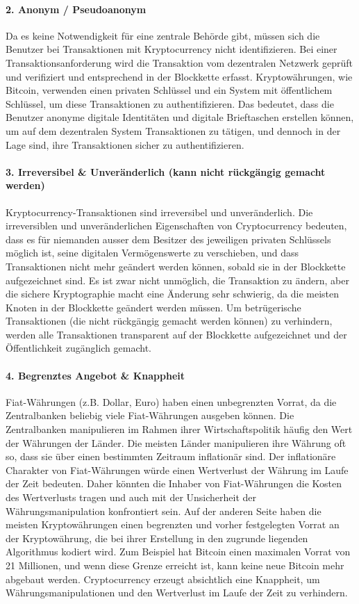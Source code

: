 \documentclass[10pt,a4paper]{article}
\begin{document}
\paragraph*{2. Anonym / Pseudoanonym}
Da es keine Notwendigkeit für eine zentrale Behörde gibt, müssen sich die Benutzer bei Transaktionen mit Kryptocurrency nicht identifizieren. Bei einer Transaktionsanforderung wird die Transaktion vom dezentralen Netzwerk geprüft und verifiziert und entsprechend in der Blockkette erfasst. Kryptowährungen, wie Bitcoin, verwenden einen privaten Schlüssel und ein System mit öffentlichem Schlüssel, um diese Transaktionen zu authentifizieren. Das bedeutet, dass die Benutzer anonyme digitale Identitäten und digitale Brieftaschen erstellen können, um auf dem dezentralen System Transaktionen zu tätigen, und dennoch in der Lage sind, ihre Transaktionen sicher zu authentifizieren.

\paragraph*{3. Irreversibel \& Unveränderlich (kann nicht rückgängig gemacht werden)}
Kryptocurrency-Transaktionen sind irreversibel und unveränderlich. Die irreversiblen und unveränderlichen Eigenschaften von Cryptocurrency bedeuten, dass es für niemanden ausser dem Besitzer des jeweiligen privaten Schlüssels möglich ist, seine digitalen Vermögenswerte zu verschieben, und dass Transaktionen nicht mehr geändert werden können, sobald sie in der Blockkette aufgezeichnet sind. Es ist zwar nicht unmöglich, die Transaktion zu ändern, aber die sichere Kryptographie macht eine Änderung sehr schwierig, da die meisten Knoten in der Blockkette geändert werden müssen. Um betrügerische Transaktionen (die nicht rückgängig gemacht werden können) zu verhindern, werden alle Transaktionen transparent auf der Blockkette aufgezeichnet und der Öffentlichkeit zugänglich gemacht.

\paragraph*{4. Begrenztes Angebot \& Knappheit}
Fiat-Währungen (z.B. Dollar, Euro) haben einen unbegrenzten Vorrat, da die Zentralbanken beliebig viele Fiat-Währungen ausgeben können. Die Zentralbanken manipulieren im Rahmen ihrer Wirtschaftspolitik häufig den Wert der Währungen der Länder. Die meisten Länder manipulieren ihre Währung oft so, dass sie über einen bestimmten Zeitraum inflationär sind. Der inflationäre Charakter von Fiat-Währungen würde einen Wertverlust der Währung im Laufe der Zeit bedeuten. Daher könnten die Inhaber von Fiat-Währungen die Kosten des Wertverlusts tragen und auch mit der Unsicherheit der Währungsmanipulation konfrontiert sein. Auf der anderen Seite haben die meisten Kryptowährungen einen begrenzten und vorher festgelegten Vorrat an der Kryptowährung, die bei ihrer Erstellung in den zugrunde liegenden Algorithmus kodiert wird. Zum Beispiel hat Bitcoin einen maximalen Vorrat von 21 Millionen, und wenn diese Grenze erreicht ist, kann keine neue Bitcoin mehr abgebaut werden. Cryptocurrency erzeugt absichtlich eine Knappheit, um Währungsmanipulationen und den Wertverlust im Laufe der Zeit zu verhindern.
\end{document}
